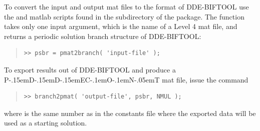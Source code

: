\documentclass[10pt,a4paper]{ddedoc}
\def\knut{{P\kern-.15emD\kern-.15emD\kern-.15emE\raisebox{.25ex}{-}C\kern-.1emO\kern-.1emN\kern-.05emT}}
\begin{document}
To convert the input and output {\sc{}mat} files to the format of DDE-BIFTOOL use the
 and  {\sc{}matlab} scripts found in the 
subdirectory of the package. The function  takes only one 
input argument, which is the name of a Level 4 {\sc{}mat} file, and returns a periodic 
solution branch structure of DDE-BIFTOOL:
{ \small \begin{quote} \begin{lstlisting}[frame=single]
>> psbr = pmat2branch( 'input-file' );
\end{lstlisting} \end{quote} } \noindent
To export results out of DDE-BIFTOOL and produce a \knut{} {\sc{}mat} file, issue the command
{ \small \begin{quote} \begin{lstlisting}[frame=single]
>> branch2pmat( 'output-file', psbr, NMUL );
\end{lstlisting} \end{quote} } \noindent
where  is the same number as in the constants file where the exported data 
will be used as a starting solution.
\end{document}
